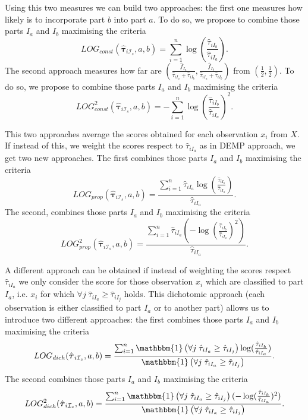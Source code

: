 \documentclass[10pt, a4paper]{article}
\newcommand{\m}[1]{\boldsymbol{#1}}
\begin{document}
Using this two measures we can build two approaches: the first one measures how likely is to incorporate part $b$ into part $a$. To do so, we propose to combine those parts $I_a$ and $I_b$ maximising the criteria
\[
LOG_{const}( \hat{\m \tau}_{i \mathcal{I}_s}, a, b) = \sum_{i=1}^n \log (\frac{ \hat{\tau}_{iI_b} }{ \hat{\tau}_{iI_a} }).
\]
The second approach measures how far are $(\frac{\hat{f}_{I_a}}{\hat{\tau}_{iI_a} + \hat{\tau}_{iI_b}}, \frac{\hat{f}_{I_b}}{\hat{\tau}_{iI_a} + \hat{\tau}_{iI_b}})$ from $(\frac{1}{2}, \frac{1}{2})$. To do so, we propose to combine those parts $I_a$ and $I_b$ maximising the criteria
\[
LOG^2_{const}( \hat{\m \tau}_{i \mathcal{I}_s}, a, b) = -\sum_{i=1}^n \log (\frac{ \hat{\tau}_{iI_b} }{ \hat{\tau}_{iI_a} })^2.
\]

This two approaches average the scores obtained for each observation $x_i$ from $X$. If instead of this, we weight the scores respect to $ \hat{\tau}_{iI_a}$  as in DEMP approach, we get two new approaches. The first combines those parts $I_a$ and $I_b$ maximising the criteria
\[
LOG_{prop}( \hat{\m \tau}_{i \mathcal{I}_s}, a, b) = \frac{ \sum_{i=1}^n \hat{\tau}_{iI_a} \log (\frac{ \hat{\tau}_{iI_b} }{ \hat{\tau}_{iI_a} })}{\hat{\tau}_{iI_a}}.
\]
The second, combines those parts $I_a$ and $I_b$ maximising the criteria
\[
LOG^2_{prop}( \hat{\m \tau}_{i \mathcal{I}_s}, a, b) = \frac{ \sum_{i=1}^n \hat{\tau}_{iI_a} (-\log (\frac{ \hat{\tau}_{iI_b} }{ \hat{\tau}_{iI_a} })^2)}{\hat{\tau}_{iI_a}}.
\]


A different approach can be obtained if instead of weighting the scores respect $ \hat{\tau}_{iI_a}$ we only consider the score for those observation $x_i$ which are classified to part $I_a$, i.e. $x_i$ for which $\forall j\; \hat{\tau}_{i I_{a}} \geq \hat{\tau}_{iI_j}$ holds. This dichotomic approach (each observation is either classified to part $I_a$ or to another part) allows us to introduce two different approaches: the first combines those parts $I_a$ and $I_b$ maximising the criteria
\[
LOG_{dich}( \hat{\m \tau}_{i \mathcal{I}_s}, a, b) = \frac{ \sum_{i=1}^n  \mathbbm{1}\left( \forall j\; \hat{\tau}_{i I_{a}} \geq \hat{\tau}_{iI_j} \right) \log (\frac{ \hat{\tau}_{iI_b} }{ \hat{\tau}_{iI_a} })}{\mathbbm{1}\left( \forall j\; \hat{\tau}_{i I_{a}} \geq \hat{\tau}_{iI_j} \right)}.
\]
The second combines those parts $I_a$ and $I_b$ maximising the criteria
\[
LOG^2_{dich}( \hat{\m \tau}_{i \mathcal{I}_s}, a, b) = \frac{ \sum_{i=1}^n \mathbbm{1}\left( \forall j\; \hat{\tau}_{i I_{a}} \geq \hat{\tau}_{iI_j} \right) (-\log (\frac{ \hat{\tau}_{iI_b} }{ \hat{\tau}_{iI_a} })^2)}{\mathbbm{1}\left( \forall j\; \hat{\tau}_{i I_{a}} \geq \hat{\tau}_{iI_j} \right)}.
\]
\end{document}
